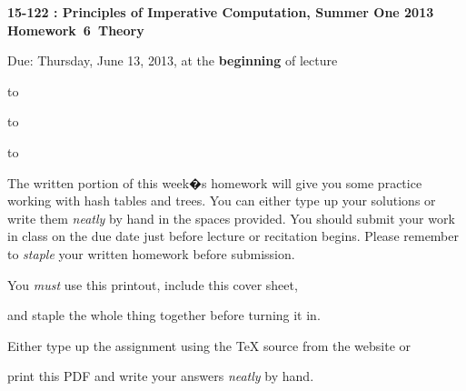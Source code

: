 \documentclass[12pt]{exam}
\newcommand{\hwnumber}{6}
\newcommand{\semester}{Summer One 2013}
\begin{document}
\addpoints
\begin{center}
\textbf{\large{15-122 : Principles of Imperative Computation, \semester
\\  \vspace{0.2in} Homework~\hwnumber~Theory 
}}

 \vspace{0.2in}

 \large{Due: Thursday, June 13, 2013, at the {\bf beginning} of lecture}
\end{center}

\vspace{0.5in}

\hbox to \textwidth{Name:\enspace\hrulefill}


\vspace{0.2in}

\hbox to \textwidth{Andrew ID:\enspace\hrulefill}

\vspace{0.2in}

\hbox to \textwidth{Recitation:\enspace\hrulefill}


\vspace{0.5in}

\noindent The written portion of this week�s homework will give you
some practice working with hash tables and trees. You can either type
up your solutions or write them \textit{neatly} by hand in the spaces
provided. You should submit your work in class on the due date just
before lecture or recitation begins. Please remember to
\textit{staple} your written homework before submission.
\vspace{0.2in}

\begin{center}
\gradetable[v][questions]
\end{center}

\vspace{0.2in}
\begin{center}
  \Large{You {\it must} use this printout, include this cover sheet,

    and staple the whole thing together before turning it in.
  
    Either type up the assignment using the TeX source from the
    website or 

    print this PDF and write your answers \textit{neatly} by
    hand.}
\end{center}
\end{document}
